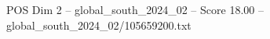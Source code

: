 \begin{textsample}{POS Dim 2 – global\_south\_2024\_02 – Score 18.00 – global\_south\_2024\_02/105659200.txt}
\end{textsample}
